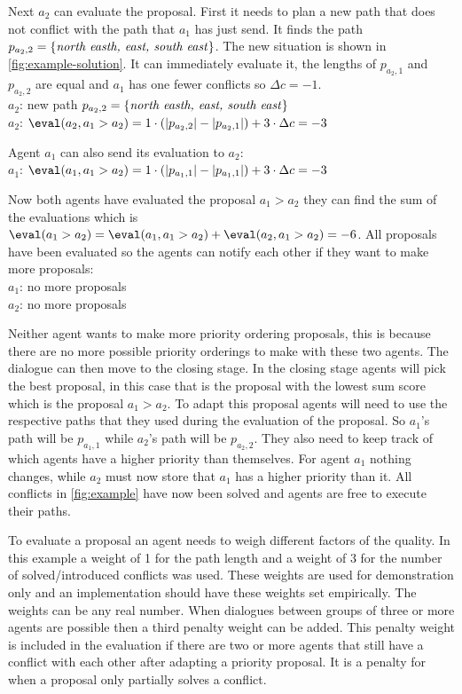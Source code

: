 Next $a_2$ can evaluate the proposal. First it needs to plan a new path that
does not conflict with the path that $a_1$ has just send. It finds the path
$p_{a_2,2} = \{\text{\emph{north easth, east, south east}}\}$. The new
situation is shown in \autoref{fig:example-solution}. It can
immediately evaluate it, the lengths of $p_{a_2,1}$ and $p_{a_2,2}$ are equal
and $a_1$ has one fewer conflicts so $\Delta c = -1$.
\\ \-\quad $a_2$: new path $p_{a_2,2} = \{\text{\emph{north easth, east, south
east}}\}$
\\ \-\quad $a_2$: $\eval(a_2, a_1 > a_2) = 1 \cdot (|p_{a_2,2}| - |p_{a_2,1}|)
+ 3 \cdot \Delta c = -3$

Agent $a_1$ can also send its evaluation to $a_2$:
\\ \-\quad $a_1$: $\eval(a_1, a_1 > a_2) = 1 \cdot (|p_{a_1,1}| - |p_{a_1,1}|)
+ 3 \cdot \Delta c = -3$

Now both agents have evaluated the proposal $a_1 > a_2$ they can find the sum
of the evaluations which is $\eval(a_1 > a_2) = \eval(a_1, a_1 > a_2) +
\eval(a_2, a_1 > a_2) =
-6$. All proposals have been evaluated so the agents can notify each other if
they want to make more proposals:
\\ \- \quad $a_1$: no more proposals
\\ \- \quad $a_2$: no more proposals

Neither agent wants to make more priority ordering proposals, this is because
there are no more possible priority orderings to make with these two agents.
The dialogue can then move to the closing stage. In the closing stage agents
will pick the best proposal, in this case that is the proposal with the lowest
sum score which is the proposal $a_1 > a_2$. To adapt this proposal agents will
need to use the respective paths that they used during the evaluation of the
proposal. So $a_1$'s path will be $p_{a_1,1}$ while $a_2$'s path will be
$p_{a_2,2}$. They also need to keep track of which agents have a higher
priority than themselves. For agent $a_1$ nothing changes, while $a_2$ must now
store that $a_1$ has a higher priority than it. All conflicts in
\autoref{fig:example} have now been solved and agents are free to execute their
paths.

To evaluate a proposal an agent needs to weigh different factors of the
quality. In this example a weight of 1 for the path length and a weight of 3
for the number of solved/introduced conflicts was used. These weights are used
for demonstration only and an implementation should have these weights set
empirically. The weights can be any real number. When dialogues between groups
of three or more agents are possible then a third penalty weight can be added.
This penalty weight is included in the evaluation if there are two or more
agents that still have a conflict with each other after adapting a priority
proposal. It is a penalty for when a proposal only partially solves a conflict.

